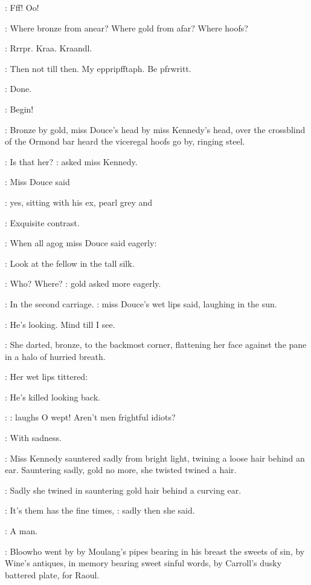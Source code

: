 :
Fff! Oo!

\BloomInt:
Where bronze from anear? Where gold from afar? Where hoofs?

:
Rrrpr. Kraa.
Kraandl.

\BloomInt:
Then not till then. My eppripfftaph. Be pfrwritt.

\BloomInt:
Done.

\BloomInt:
Begin!





:
Bronze by gold, miss Douce's head by miss Kennedy's head, over the
crossblind of the Ormond bar heard the viceregal hoofs go by, ringing
steel.

\MissK:
Is that her?
:
asked miss Kennedy.

:
Miss Douce said

\MissD:
yes, sitting with his ex, pearl grey and

\MissK:
Exquisite contrast.

:
When all agog miss Douce said eagerly:

\MissD:
Look at the fellow
in the tall silk.

\MissK:
Who? Where?
:
gold asked more eagerly.

\MissD:
In the second carriage.
:
miss Douce's wet lips said, laughing in the sun.

\MissD:
He's looking. Mind till I see.

:
She darted, bronze, to the backmost corner, flattening her face
against the pane in a halo of hurried breath.

:
Her wet lips tittered:

\MissD:
He's killed looking back.

\MissD:
 \Stage:
laughs
O wept! Aren't men frightful idiots?

:
With sadness.

:
Miss Kennedy sauntered sadly from bright light, twining a loose hair
behind an ear. Sauntering sadly, gold no more, she twisted twined
a hair.

:
Sadly she twined in sauntering gold hair behind a curving ear.

\MissK:
It's them has the fine times,
:
sadly then she said.

:
A man.

:
Bloowho went by by Moulang's pipes bearing in his breast the sweets
of sin, by Wine's antiques, in memory bearing sweet sinful words, by
Carroll's dusky battered plate, for Raoul.

